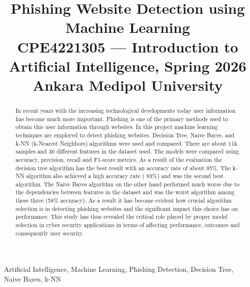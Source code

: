 \documentclass[conference]{IEEEtran}
\begin{document}
	
	\title{Phishing Website Detection using Machine Learning\\
		{\footnotesize CPE4221305 --- Introduction to Artificial Intelligence, Spring 2026\\
			Ankara Medipol University}
	}
	
	\author{
	}
	
	\maketitle
	
	\begin{abstract}
In recent years with the increasing technological developments today user information has become much more important. Phishing is one of the primary methods used to obtain this user information through websites. In this project machine learning techniques are employed to detect phishing websites. Decision Tree, Naive Bayes, and k-NN (k-Nearest Neighbors) algorithms were used and compared. There are about 11k samples and 30 different features in the dataset used. The models were compared using accuracy, precision, recall and F1-score metrics.
    As a result of the evaluation the decision tree algorithm has the best result with an accuracy rate of about 95\%. The k-NN algorithm also achieved a high accuracy rate ( 93\%) and was the second best algorithm. The Naive Bayes algorithm on the other hand performed much worse due to the dependencies between features in the dataset and was the worst algorithm among these three (58\% accuracy). 
    As a result it has become evident how crucial algorithm selection is in detecting phishing websites and the significant impact this choice has on performance. This study has thus revealed the critical role played by proper model selection in cyber security applications in terms of affecting performance, outcomes and consequently user security.
	\end{abstract}
	
	\begin{IEEEkeywords}
		Artificial Intelligence, Machine Learning, Phishing Detection, Decision Tree, Naive Bayes, k-NN
	\end{IEEEkeywords}
	
\end{document}
